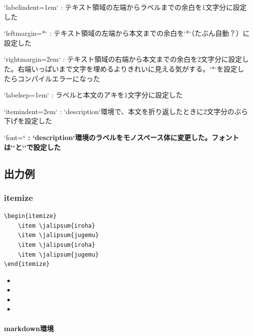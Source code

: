\documentclass[
    article,
    head_space=25truemm,
    foot_space=10truemm,
    gutter=15truemm]{jlreq}
\begin{document}
\begin{markdown}
`labelindent=1em`
: テキスト領域の左端からラベルまでの余白を1文字分に設定した

`leftmargin=*`
: テキスト領域の左端から本文までの余白を`*`（たぶん自動？）に設定した

`rightmargin=2em`
: テキスト領域の右端から本文までの余白を2文字分に設定した。右端いっぱいまで文字を埋めるよりきれいに見える気がする。`*`を設定したらコンパイルエラーになった

`labelsep=1em`
: ラベルと本文のアキを1文字分に設定した

`itemindent=2em`
: `description`環境で、本文を折り返したときに2文字分のぶら下げを設定した

`font=\ttfamily\bfseries`
: `description`環境のラベルをモノスペース体に変更した。フォントは`\setmonofont{}`と`\setmonojfont{}`で設定した
\end{markdown}

\subsection{出力例}

\subsubsection{itemize}

\begin{verbatim}
\begin{itemize}
    \item \jalipsum{iroha}
    \item \jalipsum{jugemu}
    \item \jalipsum{iroha}
    \item \jalipsum{jugemu}
\end{itemize}
\end{verbatim}

\begin{itemize}
    \item {}
    \item {}
    \item {}
    \item {}
\end{itemize}

\paragraph{markdown環境}
\end{document}
